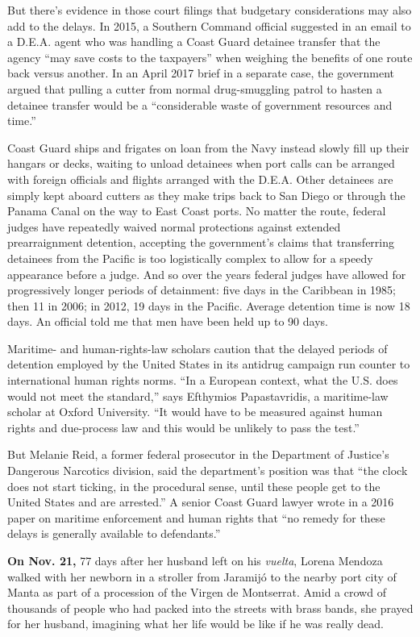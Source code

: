 But there's evidence in those court filings that budgetary
considerations may also add to the delays. In 2015, a Southern Command
official suggested in an email to a D.E.A. agent who was handling a
Coast Guard detainee transfer that the agency ``may save costs to the
taxpayers'' when weighing the benefits of one route back versus another.
In an April 2017 brief in a separate case, the government argued that
pulling a cutter from normal drug-smuggling patrol to hasten a detainee
transfer would be a ``considerable waste of government resources and
time.''

Coast Guard ships and frigates on loan from the Navy instead slowly fill
up their hangars or decks, waiting to unload detainees when port calls
can be arranged with foreign officials and flights arranged with the
D.E.A. Other detainees are simply kept aboard cutters as they make trips
back to San Diego or through the Panama Canal on the way to East Coast
ports. No matter the route, federal judges have repeatedly waived normal
protections against extended prearraignment detention, accepting the
government's claims that transferring detainees from the Pacific is too
logistically complex to allow for a speedy appearance before a judge.
And so over the years federal judges have allowed for progressively
longer periods of detainment: five days in the Caribbean in 1985; then
11 in 2006; in 2012, 19 days in the Pacific. Average detention time is
now 18 days. An official told me that men have been held up to 90 days.

Maritime- and human-rights-law scholars caution that the delayed periods
of detention employed by the United States in its antidrug campaign run
counter to international human rights norms. ``In a European context,
what the U.S. does would not meet the standard,'' says Efthymios
Papastavridis, a maritime-law scholar at Oxford University. ``It would
have to be measured against human rights and due-process law and this
would be unlikely to pass the test.''

But Melanie Reid, a former federal prosecutor in the Department of
Justice's Dangerous Narcotics division, said the department's position
was that ``the clock does not start ticking, in the procedural sense,
until these people get to the United States and are arrested.'' A senior
Coast Guard lawyer wrote in a 2016 paper on maritime enforcement and
human rights that ``no remedy for these delays is generally available to
defendants.''

\textbf{On Nov. 21,} 77 days after her husband left on his
\emph{vuelta}, Lorena Mendoza walked with her newborn in a stroller from
Jaramijó to the nearby port city of Manta as part of a procession of the
Virgen de Montserrat. Amid a crowd of thousands of people who had packed
into the streets with brass bands, she prayed for her husband, imagining
what her life would be like if he was really dead.

